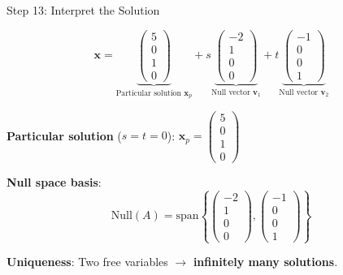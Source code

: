 \documentclass[10pt]{beamer}
\theoremstyle{definition}
\newcommand{\x}[1]{\alert{\textbf{#1}}}
\begin{document}
\begin{frame}{Step 13: Interpret the Solution}

$$\mathbf{x} = \underbrace{\begin{pmatrix} 5 \\ 0 \\ 1 \\ 0 \end{pmatrix}}_{\text{Particular solution } \mathbf{x}_p} + s\underbrace{\begin{pmatrix} -2 \\ 1 \\ 0 \\ 0 \end{pmatrix}}_{\text{Null vector } \mathbf{v}_1} + t\underbrace{\begin{pmatrix} -1 \\ 0 \\ 0 \\ 1 \end{pmatrix}}_{\text{Null vector } \mathbf{v}_2}$$

\vspace{1em}

\x{Particular solution} ($s = t = 0$): $\mathbf{x}_p = \begin{pmatrix} 5 \\ 0 \\ 1 \\ 0 \end{pmatrix}$

\vspace{0.5em}

\x{Null space basis}:
$$\text{Null}(A) = \text{span}\left\{\begin{pmatrix} -2 \\ 1 \\ 0 \\ 0 \end{pmatrix}, \begin{pmatrix} -1 \\ 0 \\ 0 \\ 1 \end{pmatrix}\right\}$$

\vspace{0.5em}

\x{Uniqueness}: Two free variables $\to$ \textbf{infinitely many solutions}.

\end{frame}

\end{document}
